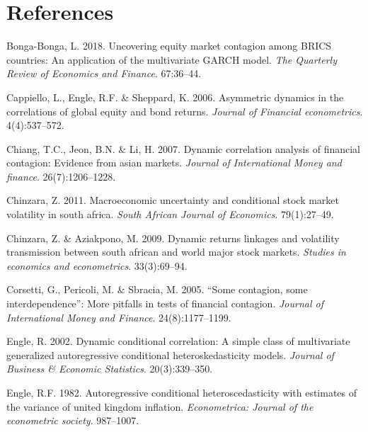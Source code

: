 \documentclass[11pt,preprint, authoryear]{elsarticle}
\numberwithin{equation}{section}
\numberwithin{figure}{section}
\numberwithin{table}{section}
\newlength{\cslhangindent}
\newenvironment{CSLReferences}%
  {\setlength{\parindent}{0pt}%
  \everypar{\setlength{\hangindent}{\cslhangindent}}\ignorespaces}%
  {\par}
\begin{document}
\newpage

\hypertarget{references}{%
\section*{References}\label{references}}

\hypertarget{refs}{}
\begin{CSLReferences}{1}{0}
\leavevmode{}%
Bonga-Bonga, L. 2018. Uncovering equity market contagion among BRICS
countries: An application of the multivariate GARCH model. \emph{The
Quarterly Review of Economics and Finance}. 67:36--44.

\leavevmode{}%
Cappiello, L., Engle, R.F. \& Sheppard, K. 2006. Asymmetric dynamics in
the correlations of global equity and bond returns. \emph{Journal of
Financial econometrics}. 4(4):537--572.

\leavevmode{}%
Chiang, T.C., Jeon, B.N. \& Li, H. 2007. Dynamic correlation analysis of
financial contagion: Evidence from asian markets. \emph{Journal of
International Money and finance}. 26(7):1206--1228.

\leavevmode{}%
Chinzara, Z. 2011. Macroeconomic uncertainty and conditional stock
market volatility in south africa. \emph{South African Journal of
Economics}. 79(1):27--49.

\leavevmode{}%
Chinzara, Z. \& Aziakpono, M. 2009. Dynamic returns linkages and
volatility transmission between south african and world major stock
markets. \emph{Studies in economics and econometrics}. 33(3):69--94.

\leavevmode{}%
Corsetti, G., Pericoli, M. \& Sbracia, M. 2005. {``Some contagion, some
interdependence''}: More pitfalls in tests of financial contagion.
\emph{Journal of International Money and Finance}. 24(8):1177--1199.

\leavevmode{}%
Engle, R. 2002. Dynamic conditional correlation: A simple class of
multivariate generalized autoregressive conditional heteroskedasticity
models. \emph{Journal of Business \& Economic Statistics}.
20(3):339--350.

\leavevmode{}%
Engle, R.F. 1982. Autoregressive conditional heteroscedasticity with
estimates of the variance of united kingdom inflation.
\emph{Econometrica: Journal of the econometric society}. 987--1007.


\end{CSLReferences}
\end{document}
